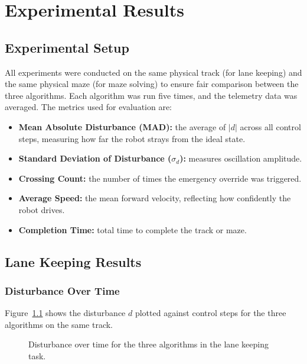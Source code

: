 \chapter{Experimental Results}
\label{ch:results}

\section{Experimental Setup}
\label{sec:exp-setup}

All experiments were conducted on the same physical track (for lane keeping) and the same physical maze (for maze solving) to ensure fair comparison between the three algorithms. Each algorithm was run five times, and the telemetry data was averaged. The metrics used for evaluation are:

\begin{itemize}
    \item \textbf{Mean Absolute Disturbance (MAD):} the average of $|d|$ across all control steps, measuring how far the robot strays from the ideal state.
    \item \textbf{Standard Deviation of Disturbance ($\sigma_d$):} measures oscillation amplitude.
    \item \textbf{Crossing Count:} the number of times the emergency override was triggered.
    \item \textbf{Average Speed:} the mean forward velocity, reflecting how confidently the robot drives.
    \item \textbf{Completion Time:} total time to complete the track or maze.
\end{itemize}


\section{Lane Keeping Results}
\label{sec:lk-results}

\subsection{Disturbance Over Time}

Figure~\ref{fig:lk-disturbance} shows the disturbance $d$ plotted against control steps for the three algorithms on the same track.

\begin{figure}[htbp]
    \centering
    \caption{Disturbance over time for the three algorithms in the lane keeping task.}
    \label{fig:lk-disturbance}
\end{figure}

